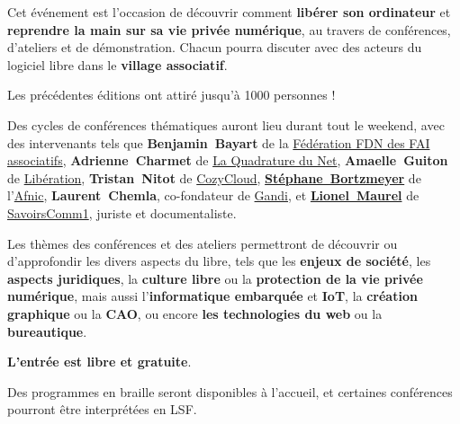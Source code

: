 
\Separateur

Cet événement est l'occasion de découvrir comment \textbf{libérer son ordinateur}
et \textbf{reprendre la main sur sa vie privée numérique},
au travers de conférences, d'ateliers et de démonstration.
Chacun pourra discuter avec des acteurs du logiciel libre dans le \textbf{village associatif}.

Les précédentes éditions ont attiré jusqu'à 1000 personnes !

\Separateur

Des cycles de conférences thématiques auront lieu durant tout le weekend,
avec des intervenants tels que \textbf{\mbox{Benjamin Bayart}} de la \href{http://ffdn.org/}{Fédération FDN des FAI associatifs},
\textbf{\mbox{Adrienne Charmet}} de \href{http://laquadrature.net/}{La Quadrature du Net},
\textbf{\mbox{Amaelle Guiton}} de \href{http://www.liberation.fr/auteur/15260-amaelle-guiton}{Libération},
\textbf{\mbox{Tristan Nitot}} de \href{https://cozy.io/fr/}{CozyCloud},
\textbf{\href{http://www.bortzmeyer.org/}{\mbox{Stéphane Bortzmeyer}}} de l'\href{}{Afnic},
\textbf{\mbox{Laurent Chemla}}, co-fondateur de \href{http://gandi.net/}{Gandi},
et \textbf{\href{http://scinfolex.com/}{\mbox{Lionel Maurel}}} de \href{http://savoirscom1.info/}{SavoirsComm1}, juriste et documentaliste.

\Separateur

Les thèmes des conférences et des ateliers permettront de découvrir ou d'approfondir
les divers aspects du libre, tels que les \textbf{enjeux de société}, les \textbf{aspects juridiques},
la \textbf{culture libre} ou la \textbf{protection de la vie privée numérique},
mais aussi l'\textbf{informatique embarquée} et \textbf{IoT}, la \textbf{création graphique} ou la \textbf{CAO},
ou encore \textbf{les technologies du web} ou la \textbf{bureautique}.

\Separateur

\textbf{L'entrée est libre et gratuite}.

\Separateur

Des programmes en braille seront disponibles à l'accueil, et certaines conférences pourront être interprétées en LSF.
